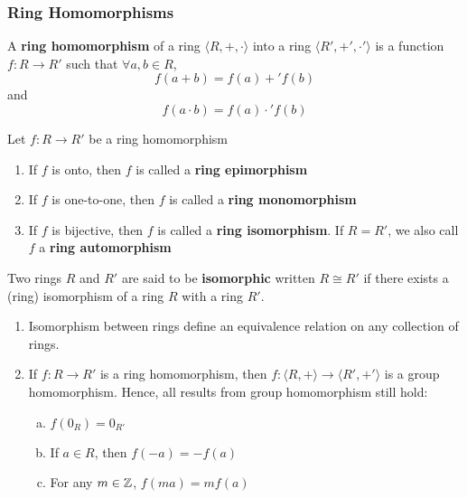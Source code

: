 \subsubsection{Ring Homomorphisms}

\begin{definition}
    A \textbf{ring homomorphism} of a ring $\langle R, +, \cdot \rangle$ into a ring $\langle R', +', \cdot' \rangle$ is a function $f : R \to R'$ such that $\forall a, b \in R$,
    \[ f(a + b) = f(a) +' f(b) \]
    and 
    \[ f(a \cdot b) = f(a) \cdot' f(b) \]
\end{definition}

\begin{remark}
    Let $f : R \to R'$  be a ring homomorphism
    \begin{enumerate}
        \item If $f$ is onto, then $f$ is called a \textbf{ring epimorphism}
        \item If $f$ is one-to-one, then $f$ is called a \textbf{ring monomorphism}
        \item If $f$ is bijective, then $f$ is called a \textbf{ring isomorphism}. If $R = R'$, we also call $f$ a \textbf{ring automorphism}
    \end{enumerate}
\end{remark}

\begin{definition}
    Two rings $R$ and $R'$ are said to be \textbf{isomorphic} written $R \cong R'$ if there exists a (ring) isomorphism of a ring $R$ with a ring $R'$.
\end{definition}

\begin{remark} \phantom{blank}
    \begin{enumerate}
        \item  Isomorphism between rings define an equivalence relation on any collection of rings.
        \item If $f : R \to R'$ is a ring homomorphism, then $f : \langle R, + \rangle \to \langle R', +' \rangle$ is a group homomorphism. Hence, all results from group homomorphism still hold:
            \begin{enumerate}[(a)]
                \item $f(0_R) = 0_{R'}$
                \item If $a \in R$, then $f(-a) = -f(a)$
                \item For any $m \in \mathbb{Z}$, $f(ma) = mf(a)$
            \end{enumerate}
    \end{enumerate}
\end{remark}

